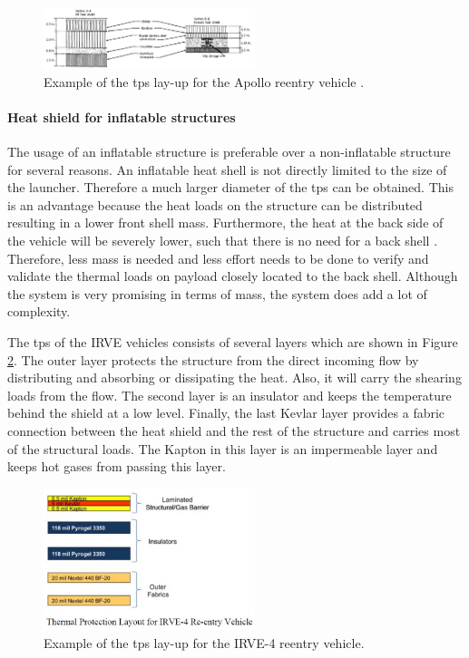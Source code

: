 \begin{figure}[H]
\centering
\includegraphics[width = 0.55\textwidth]{Figure/tpsApollo.png}
\caption[Example of the \gls{tps} lay-up for the Apollo reentry vehicle]{Example of the \gls{tps} lay-up for the Apollo reentry vehicle \cite[p.5]{Pavlosky1974}.}
\label{fig:tpslayupapollo}
\end{figure}

\paragraph{Heat shield for inflatable structures}
The usage of  an inflatable structure is preferable over a non-inflatable structure for several reasons. An inflatable heat shell is not directly limited to the size of the launcher. Therefore a much larger diameter of the \gls{tps} can be obtained. This is an advantage because the heat loads on the structure can be distributed resulting in a lower front shell mass. Furthermore, the heat at the back side of the vehicle will be severely lower, such that there is no need for a back shell \cite{Hughes2005}. Therefore, less mass is needed and less effort needs to be done to verify and validate the thermal loads on payload closely located to the back shell. Although the system is very promising in terms of mass, the system does add a lot of complexity. 

The \gls{tps} of the IRVE vehicles consists of several layers \cite{Litton2011} which are shown in Figure \ref{fig:tpslayup}. The outer layer protects the structure from the direct incoming flow by distributing and absorbing or dissipating the heat. Also, it will carry the shearing loads from the flow. The second layer is an insulator and keeps the temperature behind the shield at a low level. Finally, the last Kevlar layer provides a fabric connection between the heat shield and the rest of the structure and carries most of the structural loads. The Kapton in this layer is an impermeable layer and keeps hot gases from passing this layer.

\begin{figure}[H]
\centering
\includegraphics[width = 0.55\textwidth]{Figure/IRVE4TPS.jpg}
\caption[Example of the \gls{tps} lay-up for the IRVE-4 reentry vehicle]{Example of the \gls{tps} lay-up for the IRVE-4 reentry vehicle\cite[p.6]{Litton2011}.}
\label{fig:tpslayup}
\end{figure}


